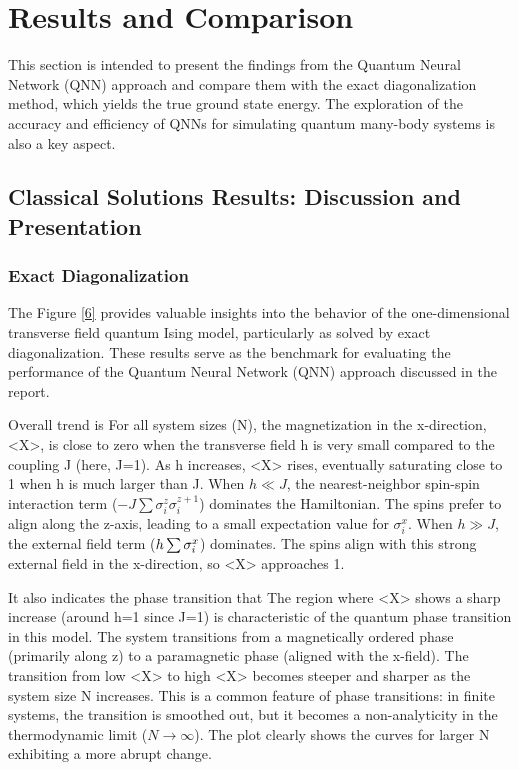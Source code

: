 \documentclass[a4paper]{article}
\begin{document}
\section{Results and Comparison}
This section is intended to present the findings from the Quantum Neural Network (QNN) approach and compare them with the exact diagonalization method, which yields the true ground state energy. The exploration of the accuracy and efficiency of QNNs for simulating quantum many-body systems is also a key aspect.

\subsection{Classical Solutions Results: Discussion and Presentation}
\subsubsection{Exact Diagonalization}
The Figure \ref{6} provides valuable insights into the behavior of the one-dimensional transverse field quantum Ising model, particularly as solved by exact diagonalization. These results serve as the benchmark for evaluating the performance of the Quantum Neural Network (QNN) approach discussed in the report.

Overall trend is For all system sizes (N), the magnetization in the x-direction, <X>, is close to zero when the transverse field h is very small compared to the coupling J (here, J=1). As h increases, <X> rises, eventually saturating close to 1 when h is much larger than J. When $h \ll J$, the nearest-neighbor spin-spin interaction term ($-J\sum\sigma_i^z\sigma_i^{z+1}$) dominates the Hamiltonian. The spins prefer to align along the z-axis, leading to a small expectation value for $\sigma_i^x$. When $h\gg J$, the external field term ($\-h\sum\sigma_i^x$) dominates. The spins align with this strong external field in the x-direction, so <X> approaches 1.

It also indicates the phase transition that The region where <X> shows a sharp increase (around h=1 since J=1) is characteristic of the quantum phase transition in this model. The system transitions from a magnetically ordered phase (primarily along z) to a paramagnetic phase (aligned with the x-field). The transition from low <X> to high <X> becomes steeper and sharper as the system size N increases. This is a common feature of phase transitions: in finite systems, the transition is smoothed out, but it becomes a non-analyticity in the thermodynamic limit ($N \to \infty$). The plot clearly shows the curves for larger N exhibiting a more abrupt change.
\end{document}
